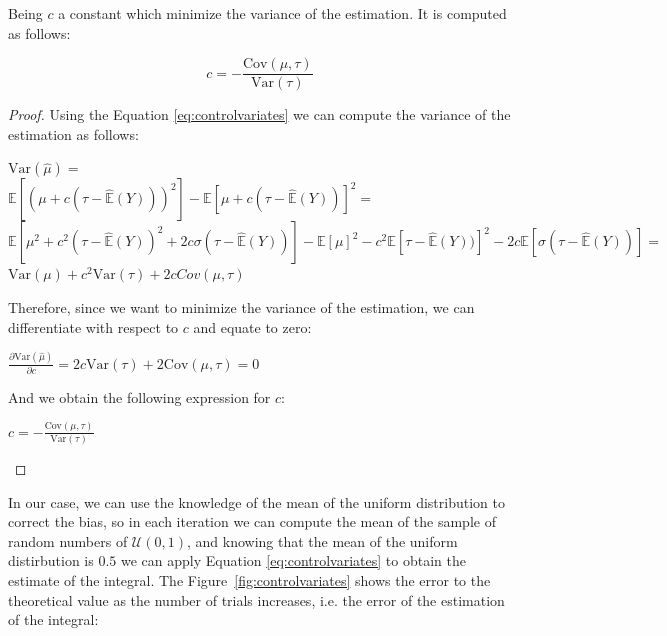 \documentclass{article}
\begin{document}
Being \(c\) a constant which minimize the variance of the estimation. It is computed as follows:

\begin{equation} 
	\label{eq:controlvariatesconstant} 
	c = -\frac{\mathrm{Cov}(\mu, \tau)}{\mathrm{Var}(\tau)}
\end{equation}

\begin{proof}
	Using the Equation \eqref{eq:controlvariates} we can compute the variance of the estimation as follows:
	\begin{center}
		\(\mathrm{Var}(\hat{\mu}) = \) \\

		\(\mathbb{E}[(\mu + c(\tau - \hat{\mathbb{E}}(Y)))^2] - \mathbb{E}[\mu + c(\tau - \hat{\mathbb{E}}(Y))]^2 =\) \\

		\(\mathbb{E}[\mu^2 + c^2(\tau - \hat{\mathbb{E}}(Y))^2 + 2c\sigma(\tau - \hat{\mathbb{E}}(Y))]  - \mathbb{E}[\mu]^2 - c^2\mathbb{E}[\tau - \hat{\mathbb{E}}(Y))]^2 - 2c\mathbb{E}[\sigma(\tau - \hat{\mathbb{E}}(Y))]  =\) \\

		\(\mathrm{Var}(\mu) + c^2 \mathrm{Var}(\tau) + 2cCov(\mu, \tau)\) 
	\end{center}
	Therefore, since we want to minimize the variance of the estimation, we can differentiate with respect to \(c\) and equate to zero:
	\begin{center}
		\(\frac{\partial \mathrm{Var}(\hat{\mu})}{\partial c} = 2c \mathrm{Var}(\tau) + 2\mathrm{Cov}(\mu, \tau ) = 0\) \\
	\end{center}
	And we obtain the following expression for \(c\):
	\begin{center}
		\(c = -\frac{\mathrm{Cov}(\mu, \tau)}{\mathrm{Var}(\tau)}\) 
	\end{center}


\end{proof}

In our case, we can use the knowledge of the mean of the uniform distribution to correct the bias, so in each iteration we can compute the mean of the sample of random numbers of \(\mathcal{U}(0,1)\), and knowing that the mean of the uniform distirbution is \(0.5\) we can apply Equation \eqref{eq:controlvariates} to obtain the estimate of the integral. The Figure~\ref{fig:controlvariates} shows the error to the theoretical value as the number of trials increases, i.e. the error of the estimation of the integral:
\end{document}
